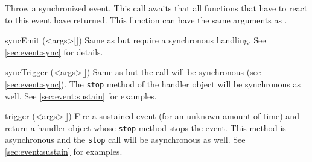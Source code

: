 \begin{urbiscriptapi}
  Throw a synchronized event. This call awaits that all functions that have
  to react to this event have returned.  This function can have the same
  arguments as .


\item[syncEmit](<args>[])%
  Same as  but require a synchronous handling.  See
  \autoref{sec:event:sync} for details.


\item[syncTrigger](<args>[])%
  Same as  but the call will be synchronous (see
  \autoref{sec:event:sync}). The \lstinline|stop| method of the handler
  object will be synchronous as well.  See \autoref{sec:event:sustain} for
  examples.


\item[trigger](<args>[])%
  Fire a sustained event (for an unknown amount of time) and return a
  handler object whose \lstinline|stop| method stops the event. This method
  is asynchronous and the \lstinline|stop| call will be asynchronous as
  well.  See \autoref{sec:event:sustain} for examples.
\end{urbiscriptapi}

